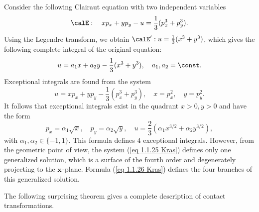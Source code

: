 \begin{example}
    Consider the following Clairaut equation with two independent variables 
    \[\calE:\quad xp_x+yp_y-u=\frac13(p_x^3+p_y^3).\]
    Using the Legendre transform, we obtain $\calE':u=\frac13(x^3+y^3)$, which gives the following complete integral of the original equation:
    \[u=a_1x+a_2y-\frac13(x^3+y^3),\quad a_1,a_2=\const.\]
    Exceptional integrals are found from the system 
    \[u=xp_x+yp_y-\frac13(p_x^3+p_y^3),\quad x=p_x^2,\quad y=p_y^2.\label{eq 1.1.25 Kras}\]
    It follows that exceptional integrals exist in the quadrant $x>0,y>0$ and have the form 
    \[p_x=\alpha_1\sqrt{x},\quad p_y=\alpha_2\sqrt{y},\quad u=\frac23(\alpha_1x^{3/2}+\alpha_2y^{3/2}),\label{eq 1.1.26 Kras}\]
    with $\alpha_1,\alpha_2\in \{-1,1\}$. This formula defines $4$ exceptional integrals. However, from the geometric point of view, the system (\ref{eq 1.1.25 Kras}) defines only one generalized solution, which is a surface of the fourth order and degenerately projecting to the $\bf{x}$-plane. Formula (\ref{eq 1.1.26 Kras}) defines the four branches of this generalized solution.
\end{example}

The following surprising theorem gives a complete description of contact transformations.

